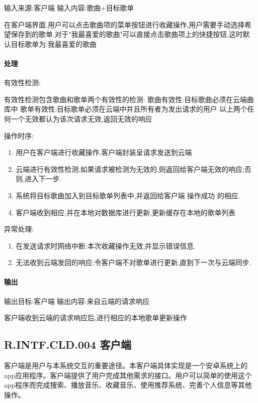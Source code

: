 输入来源:客户端
输入内容:歌曲+目标歌单

在客户端界面,用户可以点击歌曲项的菜单按钮进行收藏操作,用户需要手动选择希望保存到的歌单.对于"我最喜爱的歌曲"可以直接点击歌曲项上的快捷按钮,这时默认目标歌单为:我最喜爱的歌曲

\paragraph{处理}

有效性检测:

有效性检测包含歌曲和歌单两个有效性的检测:
歌曲有效性:目标歌曲必须在云端曲库中
歌单有效性:目标歌单必须在云端中并且所有者为发出请求的用户
以上两个任何一个无效都认为该次请求无效,返回无效的响应

操作时序:
\begin{enumerate}
	\item 用户在客户端进行收藏操作,客户端封装呈请求发送到云端
	\item 云端进行有效性检测,如果请求被检测为无效的,则返回给客户端无效的响应;否则,进入下一步.
	\item 系统将目标歌曲加入到目标歌单列表中,并返回给客户端 操作成功 的相应.
	\item 客户端收到相应,并在本地对数据库进行更新,更新缓存在本地的歌单列表
\end{enumerate}


异常处理:
\begin{enumerate}
	\item 在发送请求时网络中断:本次收藏操作无效,并显示错误信息.
	\item  无法收到云端发回的响应:令客户端不对歌单进行更新,直到下一次与云端同步.
\end{enumerate}


\paragraph{输出}

输出目标:客户端
输出内容:来自云端的请求响应

客户端收到云端的请求响应后,进行相应的本地歌单更新操作

\subsection{R.INTF.CLD.004 客户端}

客户端是用户与本系统交互的重要途径。本客户端具体实现是一个安卓系统上的app应用程序。客户端提供了用户完成其他需求的接口。用户可以简单的使用这个app程序而完成搜索、播放音乐、收藏音乐、使用推荐系统、完善个人信息等其他操作。

